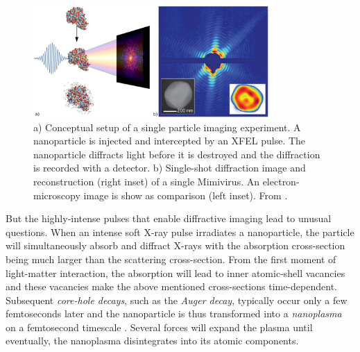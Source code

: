 \begin{figure}
	\centering
		\includegraphics[width=0.80\textwidth]{images/intro-dani.jpg}
	\caption[Conceptual setup of a single particle imaging experiment.]{a) Conceptual setup of a single particle imaging experiment. A nanoparticle is injected and intercepted by an XFEL pulse. The nanoparticle diffracts light before it is destroyed and the diffraction is recorded with a detector. b) Single-shot diffraction image and reconstruction (right inset) of a single Mimivirus. An electron-microscopy image is show as comparison  (left inset). From \cite[\href{http://creativecommons.org/licenses/by-nc-nd/3.0/de/}{\ccbyncndeu}]{Rupp-2013-Thesis,Neutze-2000-Nature,Seibert-2011-Nature}.}
	\label{fig:spi-concept}
\end{figure}
%
But the highly-intense pulses that enable diffractive imaging lead to unusual questions. When an intense soft X-ray pulse irradiates a nanoparticle, the particle will simultaneously absorb and diffract X-rays with the absorption cross-section being much larger than the scattering cross-section. From the first moment of light-matter interaction, the absorption will lead to inner atomic-shell vacancies \citep{Young-2010-Nature} and these vacancies make the above mentioned cross-sections time-dependent. Subsequent \textit{core-hole decays}, such as the \textit{Auger decay}, typically occur only a few femtoseconds later and the nanoparticle is thus transformed into a \textit{nanoplasma} on a femtosecond timescale \cite{Bostedt-2012-PRL}. Several forces will expand the plasma \citep{Gorkhover-2016-NatPho} until eventually, the nanoplasma disintegrates into its atomic components.\\[1\baselineskip]
%
